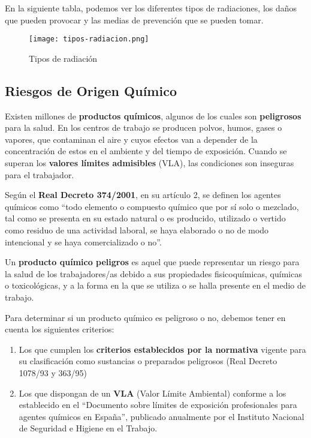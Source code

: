 En la siguiente tabla, podemos ver los diferentes tipos de radiaciones, los daños que pueden provocar y las medias  de prevención que se pueden tomar.

\begin{figure}[H]
    \centering
    \texttt{[image: tipos-radiacion.png]}
    \caption{Tipos de radiación}
\end{figure}

\subsection{Riesgos de Origen Químico}
Existen millones de \textbf{productos químicos}, algunos de los cuales son \textbf{peligrosos} para la salud. En los centros de trabajo se producen polvos, humos, gases o vapores, que contaminan el aire y cuyos efectos van a depender de la concentración de estos en el ambiente y del tiempo de exposición. Cuando se superan los \textbf{valores límites admisibles} (VLA), las condiciones son inseguras para el trabajador.

Según el \textbf{Real Decreto 374/2001}, en su artículo 2, se definen los agentes químicos como ``todo elemento o compuesto químico que por sí solo o mezclado, tal como se presenta en su estado natural o es producido, utilizado o vertido como residuo de una actividad laboral, se haya elaborado o no de modo intencional y se haya comercializado o no''.

Un \textbf{producto químico peligros} es aquel que puede representar un riesgo para la salud de los trabajadores/as debido a sus propiedades fisicoquímicas, químicas o toxicológicas, y a la forma en la que se utiliza o se halla presente en el medio de trabajo.

Para determinar si un producto químico es peligroso o no, debemos tener en cuenta los siguientes criterios:

\begin{enumerate}
    \item Los que cumplen los \textbf{criterios establecidos por la normativa} vigente para su clasificación como sustancias o preparados peligrosos (Real Decreto 1078/93 y 363/95)
    \item Los que dispongan de un \textbf{VLA} (Valor Límite Ambiental) conforme a los establecido en el ``Documento sobre límites de exposición profesionales para agentes químicos en España'', publicado anualmente por el Instituto Nacional de Seguridad e Higiene en el Trabajo.
\end{enumerate}

